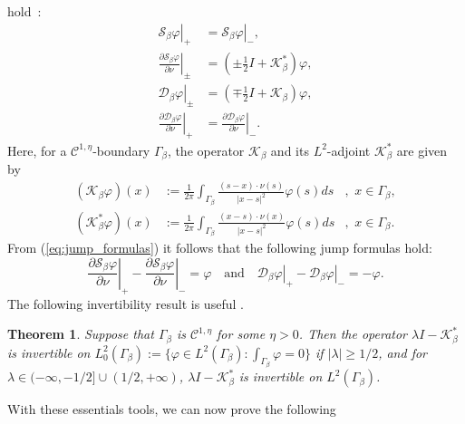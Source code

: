 \documentclass[final]{siamltex}
\numberwithin{equation}{section}
\numberwithin{figure}{section}
\numberwithin{table}{section}
\newtheorem{thm}{Theorem}
\begin{document}
hold~\cite{ammari2007polarization}:
\begin{equation}
\begin{aligned}\left.\mathcal{S}_{\beta}\varphi\right|_{+} & =\left.\mathcal{S}_{\beta}\varphi\right|_{-},\\
\left.\frac{\partial\mathcal{S}_{\beta}\varphi}{\partial\nu}\right|_{\pm} & =\left(\pm\frac{1}{2}I+\mathcal{K}_{\beta}^{*}\right)\varphi,\\
\left.\mathcal{D}_{\beta}\varphi\right|_{\pm} & =\left(\mp\frac{1}{2}I+\mathcal{K}_{\beta}\right)\varphi,\\
\left.\frac{\partial\mathcal{D}_{\beta}\varphi}{\partial\nu}\right|_{+} & =\left.\frac{\partial\mathcal{D}_{\beta}\varphi}{\partial\nu}\right|_{-}.
\end{aligned}
\label{eq:jump_formulas}
\end{equation}
 Here, for a $\mathcal{C}^{1,\eta}$-boundary $\Gamma_{\beta}$, the operator $\mathcal{K}_{\beta}$ and its $L^{2}$-adjoint
$\mathcal{K}_{\beta}^{*}$ are given by
\[
\begin{aligned}(\mathcal{K}_{\beta}\varphi)(x) & :=\frac{1}{2\pi}\int_{\Gamma_{\beta}}\frac{
(s-x)\cdot \nu(s)}{\left|x-s\right|^{2}}\varphi(s)ds & ,\,\, x\in\Gamma_{\beta},\\
(\mathcal{K}_{\beta}^{*}\varphi)(x) & :=\frac{1}{2\pi }
\int_{\Gamma_{\beta}}\frac{ (x-s)\cdot \nu(x)
}{\left|x-s\right|^{2}}\varphi(s)ds & ,\,\, x\in\Gamma_{\beta}.
\end{aligned}
\]
 From (\ref{eq:jump_formulas}) it
follows that the following jump formulas hold:
$$
\left.\frac{\partial\mathcal{S}_{\beta}\varphi}{\partial\nu}\right|_{+}
-
\left.\frac{\partial\mathcal{S}_{\beta}\varphi}{\partial\nu}\right|_{-}
= \varphi \quad \mbox{and} \quad
\left.\mathcal{D}_{\beta}\varphi\right|_{+} -
\left.\mathcal{D}_{\beta}\varphi\right|_{-} = - \varphi.
$$
The following invertibility result is useful
\cite{escauriaza1992,kellog,verchota1984}.
\begin{thm} \label{thm:invertibility_lambda_K}Suppose that
$\Gamma_{\beta}$ is $\mathcal{C}^{1,\eta}$ for some $\eta >0$.
Then the operator $\lambda I-\mathcal{K}_{\beta}^{*}$ is
invertible on $L_{0}^{2}(\Gamma_{\beta}):=\{ \varphi \in
L^2(\Gamma_{\beta}) : \int_{\Gamma_\beta} \varphi =0\}$ if
$\left|\lambda\right|\geq1/2$, and for $\lambda\in ( -\infty, -
1/2]\cup (1/2,+\infty)$, $\lambda I-\mathcal{K}_{\beta}^{*}$ is
invertible on $L^{2}(\Gamma_{\beta})$.
\end{thm} With these essentials tools, we can now prove the following
\end{document}
